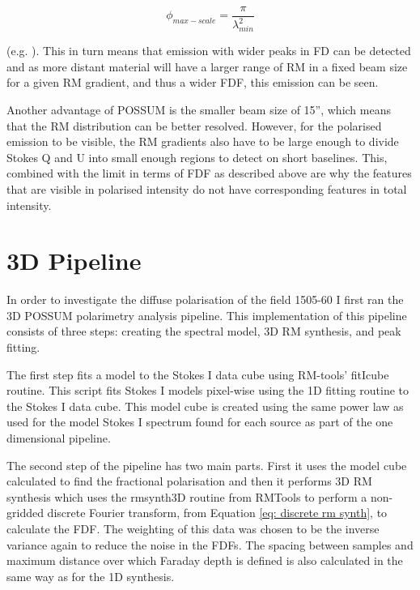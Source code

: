 \begin{equation}
    \phi_{max-scale} = \frac{\pi}{\lambda_{min}^2}
\end{equation}

\noindent (e.g. \cite{Sun_2015}). This in turn means that emission with wider peaks in FD can be detected and as more distant material will have a larger range of RM in a fixed beam size for a given RM gradient, and thus a wider FDF, this emission can be seen.

Another advantage of POSSUM is the smaller beam size of 15'', which means that the RM distribution can be better resolved. However, for the polarised emission to be visible, the RM gradients also have to be large enough to divide Stokes Q and U into small enough regions to detect on short baselines. This, combined with the limit in terms of FDF as described above are why the features that are visible in polarised intensity do not have corresponding features in total intensity.








\section{3D Pipeline}
\label{3d pipeline}

In order to investigate the diffuse polarisation of the field 1505-60 I first ran the 3D POSSUM polarimetry analysis pipeline. This implementation of this pipeline consists of three steps: creating the spectral model, 3D RM synthesis, and peak fitting.

The first step fits a model to the Stokes I data cube using RM-tools' fitIcube routine. This script fits Stokes I models pixel-wise using the 1D fitting routine to the Stokes I data cube. This model cube is created using the same power law as used for the model Stokes I spectrum found for each source as part of the one dimensional pipeline.

The second step of the pipeline has two main parts. First it uses the model cube calculated to find the fractional polarisation and then it performs 3D RM synthesis which uses the rmsynth3D routine from RMTools to perform a non-gridded discrete Fourier transform, from Equation \ref{eq: discrete rm synth}, to calculate the FDF. The weighting of this data was chosen to be the inverse variance again to reduce the noise in the FDFs. 
The spacing between samples and maximum distance over which Faraday depth is defined is also calculated in the same way as for the 1D synthesis. 

